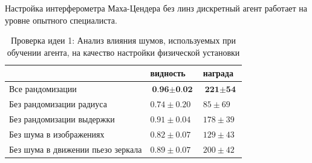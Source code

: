 \begin{frame}[allowframebreaks]{Настройка интерферометра Маха-Цендера без линз}
 дискретный агент работает на уровне опытного специалиста.

\framebreak 

\begin{table} [htbp]
    \centering
    \begin{threeparttable}
        \caption*{{\color{orange} Проверка идеи 1:} Анализ влияния шумов, используемых при обучении агента, на качество настройки физической установки}
        \begin{tabular}{| p{6cm} || p{2cm} || p{2cm} |}
            \hline
            \hline
             & видность & награда \\
            \hline
            Все рандомизации  & $\textbf{0.96} \pm \textbf{0.02}$ & $\textbf{221} \pm \textbf{54}$ \\
            Без рандомизации радиуса & $0.74 \pm 0.20$ & $85 \pm 69$ \\
            Без рандомизации выдержки & $0.91 \pm 0.04$ & $178 \pm 39$ \\
            Без шума в изображениях & $0.82 \pm 0.07$ & $129 \pm 43$ \\
            Без шума в движении пьезо зеркала &  $0.89 \pm 0.07$ & $200 \pm 42$ \\
            \hline
            \hline
        \end{tabular}
    \end{threeparttable}
\end{table}
\end{frame}

